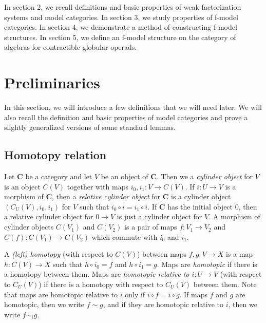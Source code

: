 \documentclass{amsart}
\theoremstyle{definition}
\newcommand{\cat}[1]{\mathbf{#1}}
\newcommand{\C}{\cat{C}}
\newcommand{\cyli}{i}
\begin{document}
In section 2, we recall definitions and basic properties of weak factorization systems and model categories.
In section 3, we study properties of f-model categories.
In section 4, we demonstrate a method of constructing f-model structures.
In section 5, we define an f-model structure on the category of algebras for contractible globular operads.

\section{Preliminaries}

In this section, we will introduce a few definitions that we will need later.
We will also recall the definition and basic properties of model categories and prove a slightly generalized versions of some standard lemmas.

\subsection{Homotopy relation}

Let $\C$ be a category and let $V$ be an object of $\C$.
Then we a \emph{cylinder object} for $V$ is an object $C(V)$ together with maps $\cyli_0,\cyli_1 : V \to C(V)$.
If $i : U \to V$ is a morphism of $\C$, then a \emph{relative cylinder object} for $\C$
is a cylinder object $(C_U(V),\cyli_0,\cyli_1)$ for $V$ such that $\cyli_0 \circ i = \cyli_1 \circ i$.
If $\C$ has the initial object $0$, then a relative cylinder object for $0 \to V$ is just a cylinder object for $V$.
A morphism of cylinder objects $C(V_1)$ and $C(V_2)$ is a pair of maps $f : V_1 \to V_2$ and $C(f) : C(V_1) \to C(V_2)$ which commute with $\cyli_0$ and $\cyli_1$.

A \emph{(left) homotopy} (with respect to $C(V)$) between maps $f,g : V \to X$ is a map $h : C(V) \to X$ such that $h \circ \cyli_0 = f$ and $h \circ \cyli_1 = g$.
Maps are \emph{homotopic} if there is a homotopy between them.
Maps are \emph{homotopic relative to $i : U \to V$} (with respect to $C_U(V)$) if there is a homotopy with respect to $C_U(V)$ between them.
Note that maps are homotopic relative to $i$ only if $i \circ f = i \circ g$.
If maps $f$ and $g$ are homotopic, then we write $f \sim g$, and if they are homotopic relative to $i$, then we write $f \sim_i g$.
\end{document}
